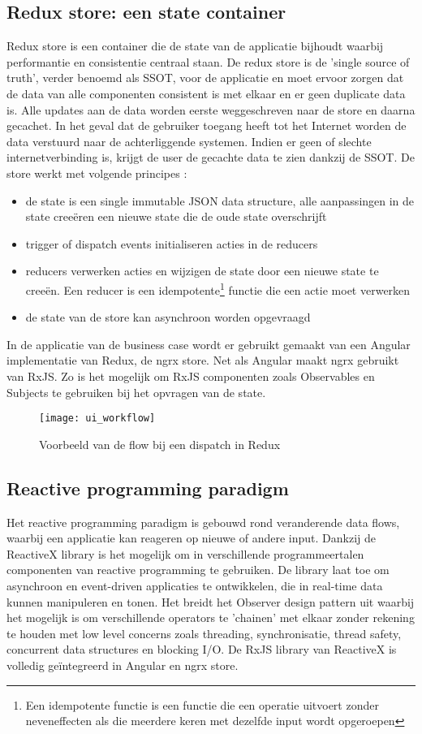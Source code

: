 \subsection{Redux store: een state container}
Redux store is een container die de state van de applicatie bijhoudt waarbij performantie en consistentie centraal staan. De redux store is de 'single source of truth', verder benoemd als SSOT, voor de applicatie en moet ervoor zorgen dat de data van alle componenten consistent is met elkaar en er geen duplicate data is. Alle updates aan de data worden eerste weggeschreven naar de store en daarna gecachet. In het geval dat de gebruiker toegang heeft tot het Internet worden de data verstuurd naar de achterliggende systemen. Indien er geen of slechte internetverbinding is, krijgt de user de gecachte data te zien dankzij de SSOT. De store werkt met volgende \autocite{ngrx-info} principes :
\begin{itemize}  
\item de state is een single immutable JSON data structure, alle aanpassingen in de state cree\"eren een nieuwe state die de oude state overschrijft
\item trigger of dispatch events initialiseren acties in de reducers
\item reducers verwerken acties en wijzigen de state door een nieuwe state te cree\"en. Een reducer is een idempotente\footnote{Een idempotente functie is een functie die een operatie uitvoert zonder neveneffecten als die meerdere keren met dezelfde input wordt opgeroepen} functie die een actie moet verwerken
\item de state van de store kan asynchroon worden opgevraagd
\end{itemize}
In de applicatie van de business case wordt er gebruikt gemaakt van een Angular implementatie van Redux, de ngrx store. Net als Angular maakt ngrx gebruikt van RxJS. Zo is het mogelijk om RxJS componenten zoals Observables en Subjects te gebruiken bij het opvragen van de state.
\begin{figure}[h]
\caption{Voorbeeld\autocite{david-meents-redux} van de flow bij een dispatch in Redux}
\centering
\texttt{[image: ui\_workflow]}
\end{figure}
\clearpage
\subsection{Reactive programming paradigm}
\label{subsec:reactive-programming}
Het reactive programming paradigm \autocite{reactivex-intro} is gebouwd rond veranderende data flows, waarbij een applicatie kan reageren op nieuwe of andere input. Dankzij de ReactiveX library is het mogelijk om in verschillende programmeertalen componenten van reactive programming te gebruiken. De library laat toe om asynchroon en event-driven applicaties te ontwikkelen, die in real-time data kunnen manipuleren en tonen. Het breidt het Observer design pattern uit waarbij het mogelijk is om verschillende operators te 'chainen' met elkaar zonder rekening te houden met low level concerns zoals threading, synchronisatie, thread safety, concurrent data structures en blocking I/O. De RxJS library van ReactiveX is volledig ge\"integreerd in Angular en ngrx store.

